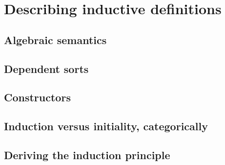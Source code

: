 \chapter{Describing inductive definitions}

\section{Algebraic semantics}

\section{Dependent sorts}

\section{Constructors}

\section{Induction versus initiality, categorically}

\section{Deriving the induction principle}

